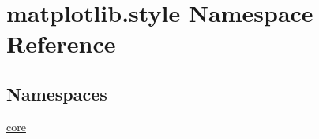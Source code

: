 \hypertarget{namespacematplotlib_1_1style}{}\section{matplotlib.\+style Namespace Reference}
\label{namespacematplotlib_1_1style}
\subsection*{Namespaces}
\begin{DoxyCompactItemize}
\item 
 \hyperlink{namespacematplotlib_1_1style_1_1core}{core}
\end{DoxyCompactItemize}

